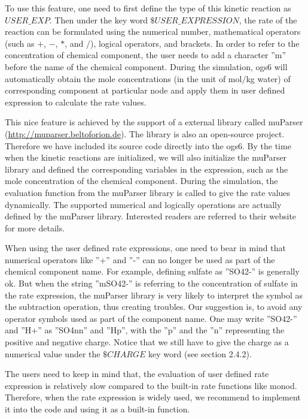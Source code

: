 To use this feature, one need to first define the type of this kinetic reaction as $USER\_EXP$. Then under the key word $\$USER\_EXPRESSION$, the rate of the reaction can be formulated using the numerical number, mathematical operators (such as $+$, $-$, $*$, and $/$), logical operators, and brackets. In order to refer to the concentration of chemical component, the user needs to add a character ''m'' before the name of the chemical component. During the simulation, ogs6 will automatically obtain the mole concentrations (in the unit of mol$\slash$kg water) of corresponding component at particular node and apply them in user defined expression to calculate the rate values. 

This nice feature is achieved by the support of a external library called muParser (\url{http://muparser.beltoforion.de}). The library is also an open-source project. Therefore we have included its source code directly into the ogs6. By the time when the kinetic reactions are initialized, we will also initialize the muParser library and defined the corresponding variables in the expression, such as the mole concentration of the chemical component. During the simulation, the evaluation function from the muParser library is called to give the rate values dynamically. The supported numerical and logically operations are actually defined by the muParser library. Interested readers are referred to their website for more details. 

When using the user defined rate expressions, one need to bear in mind that numerical operators like ''+'' and ''-'' can no longer be used as part of the chemical component name. For example, defining sulfate as ''SO42-'' is generally ok. But when the string ''mSO42-'' is referring to the concentration of sulfate in the rate expression, the muParser library is very likely to interpret the symbol as the subtraction operation, thus creating troubles. Our suggestion is, to avoid any operator symbols used as part of the component name. One may write ''SO42-'' and ''H+'' as ''SO4nn'' and ''Hp'', with the ''p'' and the ''n'' representing the positive and negative charge. Notice that we still have to give the charge as a numerical value under the $\$CHARGE$ key word (see section 2.4.2). 

The users need to keep in mind that, the evaluation of user defined rate expression is relatively slow compared to the built-in rate functions like monod. Therefore, when the rate expression is widely used, we recommend to implement it into the code and using it as a built-in function. 

